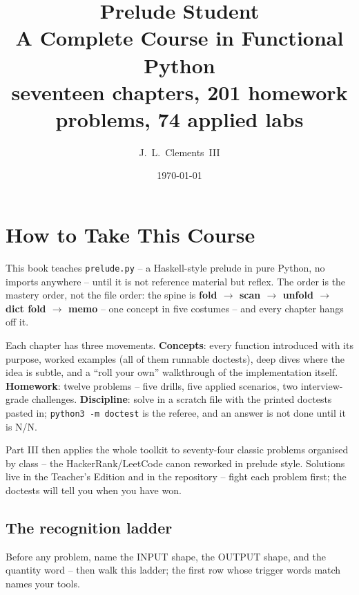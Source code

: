 \documentclass[10pt,letterpaper]{book}
\title{\Huge\bfseries Prelude Student\\[6pt]\Large A Complete Course in Functional Python\\[14pt]\normalsize seventeen chapters, 201 homework problems, 74 applied labs}
\author{J.~L.~Clements~III}
\date{\today}
\begin{document}
\frontmatter
\maketitle

\chapter{How to Take This Course}
This book teaches \texttt{prelude.py} -- a Haskell-style prelude in pure
Python, no imports anywhere -- until it is not reference material but
reflex. The order is the mastery order, not the file order: the spine is
\textbf{fold $\rightarrow$ scan $\rightarrow$ unfold $\rightarrow$ dict fold
$\rightarrow$ memo} -- one concept in five costumes -- and every chapter
hangs off it.

Each chapter has three movements. \textbf{Concepts}: every function
introduced with its purpose, worked examples (all of them runnable
doctests), deep dives where the idea is subtle, and a ``roll your own''
walkthrough of the implementation itself. \textbf{Homework}: twelve
problems -- five drills, five applied scenarios, two interview-grade
challenges. \textbf{Discipline}: solve in a scratch file with the printed
doctests pasted in; \texttt{python3 -m doctest} is the referee, and an
answer is not done until it is N/N.

Part III then applies the whole toolkit to seventy-four classic problems
organised by class -- the HackerRank/LeetCode canon reworked in prelude
style. Solutions live in the Teacher's Edition and in the repository -- fight each problem first; the doctests will tell you when you have won.

\section*{The recognition ladder}
Before any problem, name the INPUT shape, the OUTPUT shape, and the quantity
word -- then walk this ladder; the first row whose trigger words match names
your tools.
\end{document}
